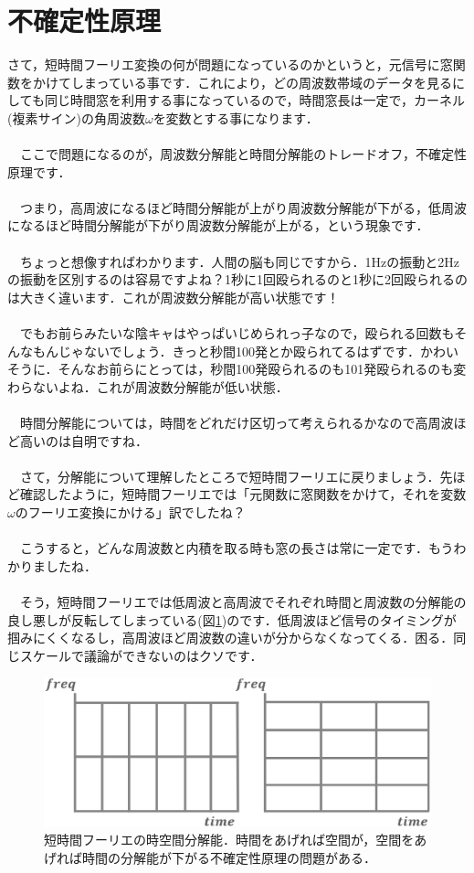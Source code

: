\documentclass[11pt,a4paper]{ujreport} 	%
\begin{document}
\section{不確定性原理}
さて，短時間フーリエ変換の何が問題になっているのかというと，元信号に窓関数をかけてしまっている事です．これにより，どの周波数帯域のデータを見るにしても同じ時間窓を利用する事になっているので，時間窓長は一定で，カーネル(複素サイン)の角周波数$\omega$を変数とする事になります．\\
\\
　ここで問題になるのが，周波数分解能と時間分解能のトレードオフ，不確定性原理です．\\
\\
　つまり，高周波になるほど時間分解能が上がり周波数分解能が下がる，低周波になるほど時間分解能が下がり周波数分解能が上がる，という現象です．\\
\\
　ちょっと想像すればわかります．人間の脳も同じですから．1Hzの振動と2Hzの振動を区別するのは容易ですよね？1秒に1回殴られるのと1秒に2回殴られるのは大きく違います．これが周波数分解能が高い状態です！\\\\
　でもお前らみたいな陰キャはやっぱいじめられっ子なので，殴られる回数もそんなもんじゃないでしょう．きっと秒間100発とか殴られてるはずです．かわいそうに．そんなお前らにとっては，秒間100発殴られるのも101発殴られるのも変わらないよね．これが周波数分解能が低い状態．\\
\\
　時間分解能については，時間をどれだけ区切って考えられるかなので高周波ほど高いのは自明ですね．\\
\\
　さて，分解能について理解したところで短時間フーリエに戻りましょう．先ほど確認したように，短時間フーリエでは「元関数に窓関数をかけて，それを変数$\omega$のフーリエ変換にかける」訳でしたね？\\
\\
　こうすると，どんな周波数と内積を取る時も窓の長さは常に一定です．もうわかりましたね．\\
\\
　そう，短時間フーリエでは低周波と高周波でそれぞれ時間と周波数の分解能の良し悪しが反転してしまっている(図\ref{im:furiers})のです．低周波ほど信号のタイミングが掴みにくくなるし，高周波ほど周波数の違いが分からなくなってくる．困る．同じスケールで議論ができないのはクソです．

\begin{figure}[H]
\label{im:furiers}
 \centering
 \includegraphics[width=15cm]{../figures/uncertainty.eps}
 \caption{短時間フーリエの時空間分解能．時間をあげれば空間が，空間をあげれば時間の分解能が下がる不確定性原理の問題がある．}
\end{figure}
\end{document}
